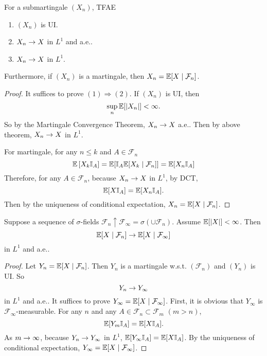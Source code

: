 \begin{thm}
    For a submartingale $(X_n)$, TFAE
    \begin{enumerate}[label=(\arabic{*})]
        \item $(X_n)$ is UI.
        \item $X_n \rightarrow X$ in $L^1$ and a.e..
        \item $X_n \rightarrow X$ in $L^1$.
    \end{enumerate}
    Furthermore, if $(X_n)$ is a martingale, then $X_n = \mathbb{E}[X \mid \mathcal{F}_n]$.
\end{thm}
\begin{proof}
    It suffices to prove $(1) \Rightarrow (2)$. If $(X_n)$ is UI, then
    \begin{equation*}
        \sup_n \mathbb{E}[\left\lvert X_n\right\lvert] < \infty.
    \end{equation*}
    So by the Martingale Convergence Theorem, $X_n \rightarrow X$ a.e.. Then by above theorem, $X_n \rightarrow X$ in $L^1$.

    \noindent For martingale, for any $n \leq k$ and $A \in \mathcal{F}_n$
    \begin{equation*}
        \mathbb{E}\left[X_k\mathbb{I}_A\right] = \mathbb{E}[\mathbb{I}_A\mathbb{E}[X_k \mid \mathcal{F}_n]] = \mathbb{E}[X_n\mathbb{I}_A]
    \end{equation*}
    Therefore, for any $A \in \mathcal{F}_n$, because $X_n \rightarrow X$ in $L^1$, by DCT,
    \begin{equation*}
        \mathbb{E}[X\mathbb{I}_A] = \mathbb{E}[X_n\mathbb{I}_A].
    \end{equation*}
    Then by the uniqueness of conditional expectation, $X_n = \mathbb{E}[X \mid \mathcal{F}_n]$. \qedhere
\end{proof}


\begin{thm}
    Suppose a sequence of $\sigma$-fields $\mathcal{F}_n \uparrow \mathcal{F}_\infty = \sigma(\cup \mathcal{F}_n)$. Assume $\mathbb{E}[\left\lvert X\right\lvert] < \infty$. Then
    \begin{equation*}
        \mathbb{E}[X \mid \mathcal{F}_n] \rightarrow \mathbb{E}[X \mid \mathcal{F}_\infty]
    \end{equation*}
    in $L^1$ and a.e..
\end{thm}
\begin{proof}
    Let $Y_n = \mathbb{E}[X \mid \mathcal{F}_n]$. Then $Y_n$ is a martingale w.s.t. $(\mathcal{F}_n)$ and $(Y_n)$ is UI. So
    \begin{equation*}
        Y_n \rightarrow Y_\infty
    \end{equation*}
    in $L^1$ and a.e.. It suffices to prove $Y_\infty = \mathbb{E}[X \mid \mathcal{F}_\infty]$. First, it is obvious that $Y_\infty$ is $\mathcal{F}_\infty$-measurable. For any $n$ and any $A \in \mathcal{F}_n \subset \mathcal{F}_m$ $(m > n)$,
    \begin{equation*}
        \mathbb{E}[Y_m\mathbb{I}_A] = \mathbb{E}[X\mathbb{I}_A].
    \end{equation*}
    As $m \rightarrow \infty$, because $Y_n \rightarrow Y_\infty$ in $L^1$, $\mathbb{E}[Y_\infty \mathbb{I}_A] = \mathbb{E}[X \mathbb{I}_A]$. By the uniqueness of conditional expectation, $Y_\infty = \mathbb{E}[X \mid \mathcal{F}_\infty]$. \qedhere
\end{proof}


